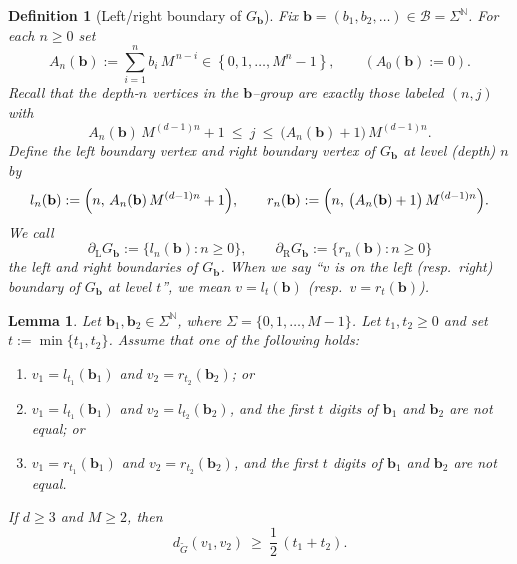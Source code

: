 \documentclass[11pt]{amsart}
\theoremstyle{plain}
\newtheorem{definition}[theorem]{Definition}
\newtheorem{lemma}[theorem]{Lemma}
\numberwithin{equation}{section}
\numberwithin{figure}{section}
\renewcommand\ell{l}
\begin{document}
\begin{definition}[Left/right boundary of $G_{\mathbf b}$]\label{def:LRboundary}
Fix $\mathbf b=(b_1,b_2,\dots)\in\mathcal B=\Sigma^{\mathbb N}$.
For each $n\ge 0$ set
\[
A_n(\mathbf b):=\sum_{i=1}^n b_i\,M^{\,n-i}\in\left\{0,1,\dots,M^n-1\right\},
\qquad (A_0(\mathbf b):=0).
\]
Recall that the depth-$n$ vertices in the $\mathbf b$--group are exactly those labeled
$(n,j)$ with
\[
A_n(\mathbf b)\,M^{(d-1)n}+1\ \le\ j\ \le\ \bigl(A_n(\mathbf b)+1\bigr)\,M^{(d-1)n}.
\]
Define the \emph{left boundary vertex} and \emph{right boundary vertex} of $G_{\mathbf b}$
at level (depth) $n$ by
\[
\ell_n(\mathbf b):=\Bigl(n,\,A_n(\mathbf b)\,M^{(d-1)n}+1\Bigr),
\qquad
r_n(\mathbf b):=\Bigl(n,\,\bigl(A_n(\mathbf b)+1\bigr)\,M^{(d-1)n}\Bigr).
\]
We call
\[
\partial_{\mathrm L}G_{\mathbf b}:=\{\ell_n(\mathbf b):n\ge 0\},
\qquad
\partial_{\mathrm R}G_{\mathbf b}:=\{r_n(\mathbf b):n\ge 0\}
\]
the \emph{left} and \emph{right boundaries} of $G_{\mathbf b}$.
When we say ``$v$ is on the left (resp.\ right) boundary of $G_{\mathbf b}$ at level $t$'',
we mean $v=\ell_t(\mathbf b)$ (resp.\ $v=r_t(\mathbf b)$).
\end{definition}



\begin{lemma}\label{lem:12b}
Let $\mathbf b_1,\mathbf b_2\in\Sigma^{\mathbb N}$, where $\Sigma=\{0,1,\ldots,M-1\}$.
Let $t_1,t_2\ge0$ and set $t:=\min\{t_1,t_2\}$.
Assume that one of the following holds:
\begin{enumerate}
\item $v_1=\ell_{t_1}(\mathbf b_1)$ and $v_2=r_{t_2}(\mathbf b_2)$; or
\item $v_1=\ell_{t_1}(\mathbf b_1)$ and $v_2=\ell_{t_2}(\mathbf b_2)$, and the first $t$ digits of
$\mathbf b_1$ and $\mathbf b_2$ are not equal; or
\item $v_1=r_{t_1}(\mathbf b_1)$ and $v_2=r_{t_2}(\mathbf b_2)$, and the first $t$ digits of
$\mathbf b_1$ and $\mathbf b_2$ are not equal.
\end{enumerate}
If $d\geq 3$ and $M\geq 2$, then
\begin{equation}\label{eq:12b}
d_{\widetilde G}(v_1,v_2)\ \ge\ \frac{1}{2}\,(t_1+t_2).
\end{equation}
\end{lemma}
\end{document}
